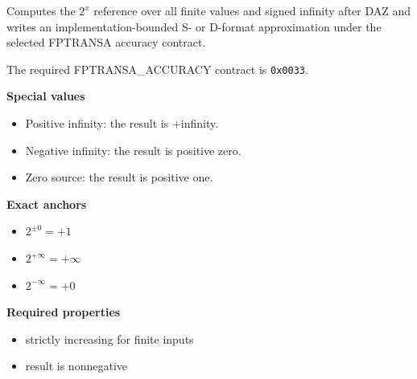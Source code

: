 Computes the $2^x$ reference over all finite values and signed infinity after DAZ and writes an implementation-bounded S- or D-format approximation under the selected FPTRANSA accuracy contract.

The required FPTRANSA\_ACCURACY contract is \texttt{0x0033}.

\textbf{Special values}\par
\begin{itemize}
\item Positive infinity: the result is +infinity.
\item Negative infinity: the result is positive zero.
\item Zero source: the result is positive one.
\end{itemize}

\textbf{Exact anchors}\par
\begin{itemize}
\item $2^{\mathord{\pm}0} = +1$
\item $2^{+\infty} = +\infty$
\item $2^{-\infty} = +0$
\end{itemize}

\textbf{Required properties}\par
\begin{itemize}
\item strictly increasing for finite inputs
\item result is nonnegative
\end{itemize}
